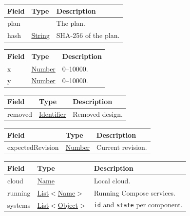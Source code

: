 \documentclass[a4paper]{arrowhead}
\newcommand{\mref}[2][]{{\textcolor{ArrowheadPurple}{\hyperref[sec:model:#2]{\ifstrempty{#1}{#2}{#1}}}}}
\newcommand{\pref}[1]{{\textcolor{ArrowheadGrey}{\hyperref[sec:model:primitives:#1]{#1}}}}
\begin{document}
\noindent\begin{tabularx}{\textwidth}{| >{\raggedright\arraybackslash}p{3.6cm} | >{\raggedright\arraybackslash\small}p{4.4cm} | X |} \hline
\rowcolor{gray!33} Field & Type & Description \\ \hline
plan & \mref{Plan} & The plan. \\ \hline
hash & \pref{String} & SHA-256 of the plan. \\ \hline
\end{tabularx}


\noindent\begin{tabularx}{\textwidth}{| >{\raggedright\arraybackslash}p{3.6cm} | >{\raggedright\arraybackslash\small}p{4.4cm} | X |} \hline
\rowcolor{gray!33} Field & Type & Description \\ \hline
x & \pref{Number} & 0--10000. \\ \hline
y & \pref{Number} & 0--10000. \\ \hline
\end{tabularx}


\noindent\begin{tabularx}{\textwidth}{| >{\raggedright\arraybackslash}p{3.6cm} | >{\raggedright\arraybackslash\small}p{4.4cm} | X |} \hline
\rowcolor{gray!33} Field & Type & Description \\ \hline
removed & \pref{Identifier} & Removed design. \\ \hline
\end{tabularx}


\noindent\begin{tabularx}{\textwidth}{| >{\raggedright\arraybackslash}p{3.6cm} | >{\raggedright\arraybackslash\small}p{4.4cm} | X |} \hline
\rowcolor{gray!33} Field & Type & Description \\ \hline
expectedRevision & \pref{Number} & Current revision. \\ \hline
\end{tabularx}


\noindent\begin{tabularx}{\textwidth}{| >{\raggedright\arraybackslash}p{3.6cm} | >{\raggedright\arraybackslash\small}p{4.4cm} | X |} \hline
\rowcolor{gray!33} Field & Type & Description \\ \hline
cloud & \pref{Name} & Local cloud. \\ \hline
running & \pref{List}$<$\pref{Name}$>$ & Running Compose services. \\ \hline
systems & \pref{List}$<$\pref{Object}$>$ & \texttt{id} and \texttt{state} per component. \\ \hline
\end{tabularx}
\end{document}
